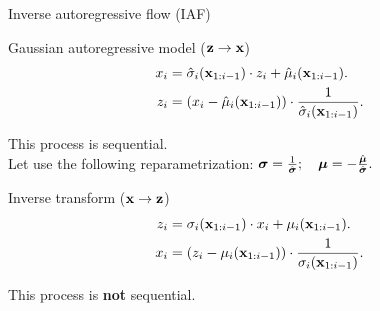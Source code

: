 \begin{frame}{Inverse autoregressive flow (IAF)}
	
	\begin{block}{Gaussian autoregressive model ($\mathbf{z} \rightarrow \mathbf{x}$)}
		\vspace{-0.5cm}
		\begin{align*}
		x_i &= \hat{\sigma}_i (\mathbf{x}_{1:i-1}) \cdot z_i + \hat{\mu}_i(\mathbf{x}_{1:i-1}).\\
		z_i &= \left(x_i - \hat{\mu}_i(\mathbf{x}_{1:i-1}) \right) \cdot \frac{1}{ \hat{\sigma}_i (\mathbf{x}_{1:i-1})}.
		\end{align*}
		\vspace{-0.5cm}
	\end{block}
	This process is sequential. \\
	Let use the following reparametrization:
	$\boldsymbol{\sigma} = \frac{1}{\hat{\boldsymbol{\sigma}}}; \quad \boldsymbol{\mu} = - \frac{\hat{\boldsymbol{\mu}}}{\hat{\boldsymbol{\sigma}}}.$
	
	\begin{block}{Inverse transform ($\mathbf{x} \rightarrow \mathbf{z}$)}
		\vspace{-0.3cm}
		\begin{align*}
		z_i &= \sigma_i (\mathbf{x}_{1:i-1}) \cdot x_i + \mu_i(\mathbf{x}_{1:i-1}). \\
		x_i &= \left( z_i - \mu_i(\mathbf{x}_{1:i-1})\right) \cdot \frac{1}{\sigma_i (\mathbf{x}_{1:i-1}) }.
		\end{align*}
		\vspace{-0.3cm}
	\end{block}
	This process is \textbf{not} sequential.

\end{frame}
